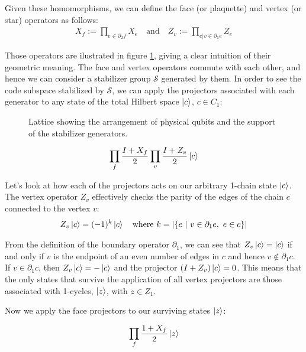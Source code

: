\documentclass[12pt, twoside, openany]{book}
\begin{document}
Given these homomorphisms, we can define the face (or plaquette) and vertex (or star) operators as follows:
\begin{align}
X_f:= \prod _{e \in \partial_2 f} X_e \quad \text{and} \quad Z_v := \prod _{e |v \in \partial_1 e} Z_e
\end{align}

Those operators are ilustrated in figure \ref{fig:surface_code}, giving a clear intuition of their geometric meaning. The face and vertex operators commute with each other, and hence we can consider a stabilizer group $\mathcal{S}$ generated by them. In order to see the code subspace stabilized by $\mathcal{S}$, we can apply the projectors associated with each generator to any state of the total Hilbert space $\ket{c}$, $c \in C_1$:

\begin{figure}
\centering

\caption{Lattice showing the arrangement of physical qubits and the support of the stabilizer generators.}
\label{fig:surface_code}
\end{figure}

\begin{align*}
    \prod_{f} \frac{I + X_f}{2} \prod_{v} \frac{I + Z_v}{2} \ket{c} \\
\end{align*}

Let's look at how each of the projectors acts on our arbitrary 1-chain state $\ket{c}$. The vertex operator $Z_v$ effectively checks the parity of the edges of the chain $c$ connected to the vertex $v$:
\begin{align*}
    Z_v \ket{c} = (-1)^k \ket{c} \quad \text{where} \ k = |\{ e \ | \  v \in \partial_1 e, \  e \in c \}|
\end{align*}

From the definition of the boundary operator $\partial_1$, we can see that $Z_v \ket{c} = \ket{c}$ if and only if $v$ is the endpoint of an even number of edges in $c$ and hence $v \notin \partial_1 c$. If $v \in \partial_1 c$, then $Z_v \ket{c} = - \ket{c}$ and the projector $(I+Z_v)\ket{c}=0$. This means that the only states that survive the application of all vertex projectors are those associated with 1-cycles, $\ket{z}$, with $z \in Z_1$. 

Now we apply the face projectors to our surviving states $\ket{z}$:

\begin{align*}
    \prod_f \frac{1+X_f}{2} \ket{z}
\end{align*}
\end{document}

